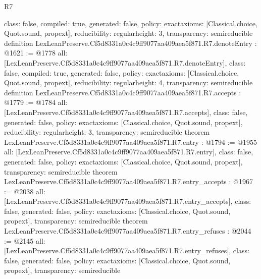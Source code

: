 \begin{lexlean}{R7}
\begin{coremodule}
{  class: false,
  compiled: true,
  generated: false,
  policy: exact{axioms: [Classical.choice, Quot.sound, propext]},
  reducibility: regular{height: 3},
  transparency: semireducible
}
definition LexLeanPreserve.Cf5d8331a0c4c9ff9077aa409aea5f871.R7.denoteEntry : @1621 := @1778 {
  all: [LexLeanPreserve.Cf5d8331a0c4c9ff9077aa409aea5f871.R7.denoteEntry],
  class: false,
  compiled: true,
  generated: false,
  policy: exact{axioms: [Classical.choice, Quot.sound, propext]},
  reducibility: regular{height: 4},
  transparency: semireducible
}
definition LexLeanPreserve.Cf5d8331a0c4c9ff9077aa409aea5f871.R7.accepts : @1779 := @1784 {
  all: [LexLeanPreserve.Cf5d8331a0c4c9ff9077aa409aea5f871.R7.accepts],
  class: false,
  generated: false,
  policy: exact{axioms: [Classical.choice, Quot.sound, propext]},
  reducibility: regular{height: 3},
  transparency: semireducible
}
theorem LexLeanPreserve.Cf5d8331a0c4c9ff9077aa409aea5f871.R7.entry : @1794 := @1955 {
  all: [LexLeanPreserve.Cf5d8331a0c4c9ff9077aa409aea5f871.R7.entry],
  class: false,
  generated: false,
  policy: exact{axioms: [Classical.choice, Quot.sound, propext]},
  transparency: semireducible
}
theorem LexLeanPreserve.Cf5d8331a0c4c9ff9077aa409aea5f871.R7.entry_accepts : @1967 := @2038 {
  all: [LexLeanPreserve.Cf5d8331a0c4c9ff9077aa409aea5f871.R7.entry_accepts],
  class: false,
  generated: false,
  policy: exact{axioms: [Classical.choice, Quot.sound, propext]},
  transparency: semireducible
}
theorem LexLeanPreserve.Cf5d8331a0c4c9ff9077aa409aea5f871.R7.entry_refuses : @2044 := @2145 {
  all: [LexLeanPreserve.Cf5d8331a0c4c9ff9077aa409aea5f871.R7.entry_refuses],
  class: false,
  generated: false,
  policy: exact{axioms: [Classical.choice, Quot.sound, propext]},
  transparency: semireducible
}


\end{coremodule}
\end{lexlean}

